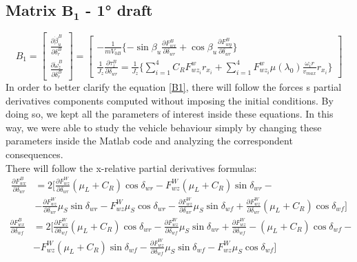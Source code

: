 \subsection{Matrix $\mathbf{B_{1}}$ - 1° draft} 
		\begin{equation} \label{B1}
			B_{1}=
			\begin{bmatrix} 
				\frac{\partial\dot{\beta}_{u}^{B}}{\partial\delta_{r}^{B}} \\
				\frac{\partial\dot{\omega}_{z}^{B}}{\partial\delta_{r}^{B}}
			\end{bmatrix} = 
			\begin{bmatrix}
				-\frac{1}{mV_{0B}}\{-\sin\beta_{u}\frac{\partial F_{wx}^{B}}{\partial \delta_{wr}} + \cos\beta_{u}\frac{\partial F_{wy}^{B}}{\partial \delta_{wr}}\}  \\
				\frac{1}{J_{z}} \frac{\partial \tau_{z}^{B}}{\partial\delta_{wr}} = \frac{1}{J_{z}} \{ \sum\limits_{i=1}^4 C_{R}F_{wz_{i}}^{w} r_{x_{i}} + \sum\limits_{i=1}^4 F_{wz_{i}}^{w} \mu(\lambda_{0}) \frac{\omega_{i} r}{v_{max}}r_{x_{i}} \}
			\end{bmatrix}
		\end{equation} 
	In order to better clarify the equation \ref{B1}, there will follow the forces s partial derivatives components computed without imposing the initial conditions. By doing so, we kept all the parameters of interest inside these equations. In this way, we were able to study the vehicle behaviour simply by changing these parameters inside the Matlab code and analyzing the correspondent consequences. \\ There will follow the x-relative partial derivatives formulas: 
		\begin{equation} \label{Fwx su deltaR }
			\begin{split}
				\frac{\partial F_{wx}^{B}}{\partial \delta_{wr}} &= 2 [\frac{\partial F_{wz}^{W}}{\partial \delta_{wr}} (\mu_{L}+C_{R}) \cos\delta_{wr} - F_{wz}^{W} (\mu_{L}+C_{R})\sin\delta_{wr} - \\
				&- \frac{\partial F_{wz}^{W}}{\partial \delta_{wr}} \mu_{S} \sin \delta_{wr} - F_{wz}^{W} \mu_{S}\cos\delta_{wr} - \frac{\partial F_{wz}^{W}}{\partial \delta_{wr}} \mu_{S} \sin \delta_{wf} + \frac{\partial F_{wz}^{W}}{\partial \delta_{wr}} (\mu_{L}+C_{R}) \cos\delta_{wf}]
			\end{split}
		\end{equation}
		\begin{equation} \label{Fwx su deltaF}
			\begin{split}
				\frac{\partial F_{wx}^{B}}{\partial \delta_{wf}} &= 2 [\frac{\partial F_{wz}^{W}}{\partial \delta_{wf}} (\mu_{L}+C_{R}) \cos\delta_{wr} - \frac{\partial F_{wz}^{W}}{\partial \delta_{wf}} \mu_{S} \sin \delta_{wr} + \frac{\partial F_{wz}^{W}}{\partial \delta_{wf}} - (\mu_{L}+C_{R}) \cos\delta_{wf} - \\
				&- F_{wz}^{W} (\mu_{L}+C_{R})\sin\delta_{wf}
				- \frac{\partial F_{wz}^{W}}{\partial \delta_{wf}} \mu_{S} \sin \delta_{wf} - F_{wz}^{W} \mu_{S}\cos\delta_{wf}]
			\end{split}
		\end{equation}
